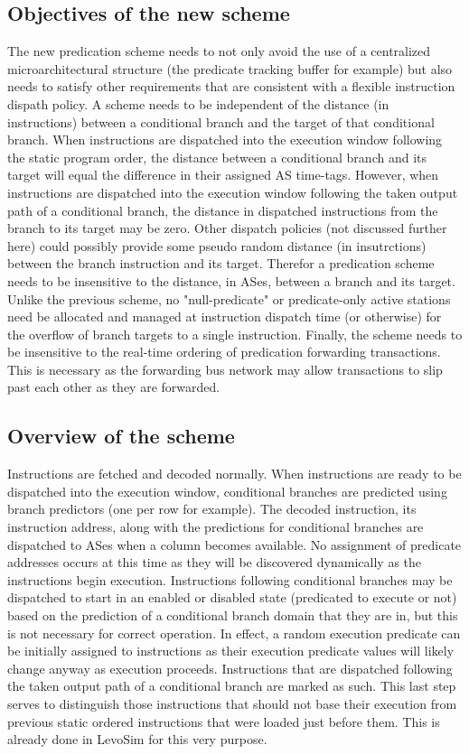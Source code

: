 \documentclass[10pt,dvips]{article}
\begin{document}
\subsection{Objectives of the new scheme}
%
The new predication scheme needs to not only avoid the use of a
centralized microarchitectural structure (the predicate tracking buffer
for example) but also needs to satisfy other requirements that are
consistent with a flexible instruction dispath policy.  A scheme needs
to be independent of the distance (in instructions) between a conditional
branch and the target of that conditional branch.  When instructions
are dispatched into the execution window following the static program
order, the distance between a conditional branch and its target will
equal the difference in their assigned AS time-tags.  However, when
instructions are dispatched into the 
execution window following the taken output path
of a conditional branch, the distance in dispatched instructions 
from the branch to its target may
be zero.  Other dispatch policies (not discussed further here) could
possibly provide some pseudo random distance (in insutrctions) between the
branch instruction and its target.  Therefor a predication scheme needs
to be insensitive to the distance, in ASes, between a branch and its
target.
Unlike the previous scheme, no "null-predicate" or predicate-only
active stations
need be allocated and managed at instruction dispatch time (or otherwise)
for the overflow of branch targets to a single instruction.
Finally, the scheme needs to be insensitive to the
real-time ordering of predication forwarding transactions.
This is necessary as the forwarding bus network may allow transactions
to slip past each other as they are forwarded.
%
\subsection{Overview of the scheme}
%
Instructions are fetched and decoded normally.  When instructions are
ready to be dispatched into the execution window, conditional branches are
predicted using branch predictors (one per row for example).  The
decoded instruction, its instruction address, along with 
the predictions for conditional branches
are dispatched to ASes when a column becomes available.  No assignment of
predicate addresses occurs at this time as they will be discovered
dynamically as the instructions begin execution.  Instructions
following conditional branches may be dispatched to start in an enabled or
disabled state (predicated to execute or not) based on the prediction
of a conditional branch domain that they are in, but this is not
necessary for correct operation.  In effect, a random execution
predicate can be initially assigned to instructions as their execution
predicate
values will likely change anyway as execution proceeds.
Instructions that are dispatched following the taken output path
of a conditional branch are marked as such.
This last step serves to distinguish those
instructions that should not base their execution from previous
static ordered instructions that were loaded just before them.
This is already done in LevoSim for this very purpose.
\end{document}

